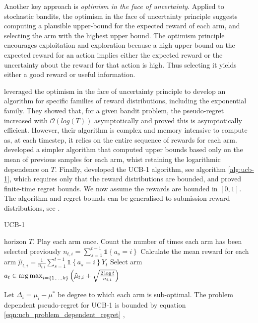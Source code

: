 \documentclass[11pt,a4paper,oneside]{book}
\newcommand{\set}[1]{\left\{#1\right\}}
\newcommand{\ind}[1]{\mathds{1}\!\!\set{#1}}
\newcommand{\argmax}{\operatornamewithlimits{arg\,max}}
\newcommand{\bigo}[1]{\mathcal{O}\left( #1 \right)}
\theoremstyle{plain}
\theoremstyle{definition}
\begin{document}
Another key approach is \emph{optimism in the face of uncertainty}. Applied to stochastic bandits, the optimism in the face of uncertainty principle suggests computing a plausible upper-bound for the expected reward of each arm, and selecting the arm with the highest upper bound. The optimism principle encourages exploitation and exploration because a high upper bound on the expected reward for an action implies either the expected reward or the uncertainty about the reward for that action is high. Thus selecting it yields either a good reward or useful information. 

\citet{Lai1985} leveraged the optimism in the face of uncertainty principle to develop an algorithm for specific families of reward distributions, including the exponential family. They showed that, for a given bandit problem, the pseudo-regret increased with $\bigo{log(T)}$ asymptotically and proved this is asymptotically efficient. However, their algorithm is complex and memory intensive to compute as, at each timestep, it relies on the entire sequence of rewards for each arm. \citet{Agrawal1995} developed a simpler algorithm that computed upper bounds based only on the mean of previous samples for each arm, whist retaining the logarithmic dependence on $T$. Finally, \citet{Auer2002} developed the UCB-1 algorithm, see algorithm \ref{alg:ucb-1}, which requires only that the reward distributions are bounded, and proved finite-time regret bounds. We now assume the rewards are bounded in $[0,1]$. The algorithm and regret bounds can be generalised to submission reward distributions, see \citet{Bubeck2012}.

\begin{algorithm}[H]
\caption{UCB-1}\label{alg:ucb-1}
\begin{algorithmic}[1]
 horizon $T$.
\STATE Play each arm once. 
\STATE Count the number of times each arm has been selected previously $n_{t,i} = \sum_{s=1}^{t-1} \ind{a_s = i}$
\STATE Calculate the mean reward for each arm $\hat{\mu}_{t,i} = \frac{1}{n_{t,i}} \sum_{s=1}^{t-1}\ind{a_s = i}Y_t$
\STATE Select arm $a_t \in \argmax_{i = \set{1,...,k}}\left(\hat{\mu}_{t,i}+\sqrt{\frac{2 \log{t}}{n_{t,i}}}\right)$
\ENDFOR
\end{algorithmic}
\end{algorithm}
 
Let $\Delta_i = \mu_i - \mu^*$ be degree to which each arm is sub-optimal. The problem dependent pseudo-regret for UCB-1 is bounded by equation \ref{eqn:ucb_problem_dependent_regret} \citep{Bubeck2012},
\end{document}
